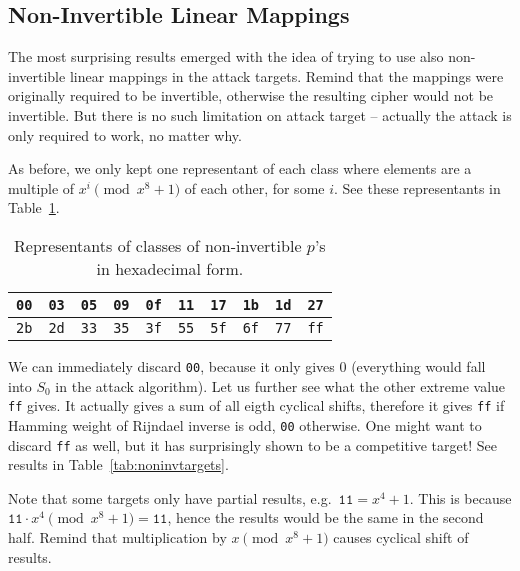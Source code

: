 
\subsection{Non-Invertible Linear Mappings}

The most surprising results emerged with the idea of trying to use also non-invertible linear mappings in the attack targets. Remind that the mappings were originally required to be invertible, otherwise the resulting cipher would not be invertible. But there is no such limitation on attack target -- actually the attack is only required to work, no matter why.

As before, we only kept one representant of each class where elements are a multiple of $x^i\pmod{x^8+1}$ of each other, for some $i$. See these representants in Table~\ref{tab:classreprenoninv}.

\begin{table}[h]
	\begin{center}
	\begin{tabular}{| c | c | c | c | c | c | c | c | c | c |}
		\hline
		{\tt 00} & {\tt 03} & {\tt 05} & {\tt 09} & {\tt 0f} & {\tt 11} & {\tt 17} & {\tt 1b} & {\tt 1d} & {\tt 27} \\
		\hline
		{\tt 2b} & {\tt 2d} & {\tt 33} & {\tt 35} & {\tt 3f} & {\tt 55} & {\tt 5f} & {\tt 6f} & {\tt 77} & {\tt ff} \\
		\hline
	\end{tabular}
	\end{center}
\caption{Representants of classes of non-invertible $p$'s in hexadecimal form.}
\label{tab:classreprenoninv}
\end{table}

We can immediately discard {\tt 00}, because it only gives $0$ (everything would fall into $S_0$ in the attack algorithm). Let us further see what the other extreme value {\tt ff} gives. It actually gives a sum of all eigth cyclical shifts, therefore it gives {\tt ff} if Hamming weight of Rijndael inverse is odd, {\tt 00} otherwise. One might want to discard {\tt ff} as well, but it has surprisingly shown to be a competitive target! See results in Table~\ref{tab:noninvtargets}.

Note that some targets only have partial results, e.g.\ $\texttt{11} = x^4+1$. This is because $\texttt{11}\cdot x^4 \pmod{x^8+1} = \texttt{11}$, hence the results would be the same in the second half. Remind that multiplication by $x\pmod{x^8+1}$ causes cyclical shift of results.

